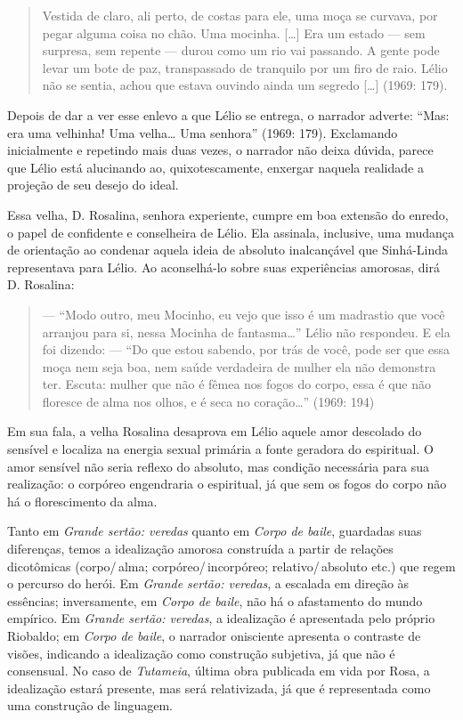 {\begin{quote}
Vestida de claro, ali perto, de costas para ele, uma moça se curvava,
por pegar alguma coisa no chão. Uma mocinha. [\ldots{}] Era um estado ---
sem surpresa, sem repente --- durou como um rio vai passando. A gente
pode levar um bote de paz, transpassado de tranquilo por um firo de
raio. Lélio não se sentia, achou que estava ouvindo ainda um segredo
[\ldots{}] (1969: 179).
\end{quote}

Depois de dar a ver esse enlevo a que Lélio se entrega, o narrador
adverte: “Mas: era uma velhinha! Uma velha\ldots{} Uma senhora” (1969:
179). Exclamando inicialmente e repetindo mais duas vezes, o narrador
não deixa dúvida, parece que Lélio está alucinando ao,
quixotescamente, enxergar naquela realidade a projeção de seu desejo
do ideal. 

Essa velha, D. Rosalina, senhora experiente, cumpre em boa extensão do
enredo, o papel de confidente e conselheira de Lélio. Ela assinala,
inclusive, uma mudança de orientação ao condenar aquela ideia de
absoluto inalcançável que Sinhá-Linda representava para Lélio. Ao
aconselhá-lo sobre suas experiências amorosas, dirá D. Rosalina:

\begin{quote}
--- “Modo outro, meu Mocinho, eu vejo que isso é um madrastio que você
arranjou para si, nessa Mocinha de fantasma\ldots{}” Lélio não respondeu.
E ela foi dizendo: --- “Do que estou sabendo, por trás de você, pode
ser que essa moça nem seja boa, nem saúde verdadeira de mulher ela
não demonstra ter. Escuta: mulher que não é fêmea nos fogos do corpo,
essa é que não floresce de alma nos olhos, e é seca no coração\ldots{}”
(1969: 194)
\end{quote}

Em sua fala, a velha Rosalina desaprova em Lélio aquele amor descolado
do sensível e localiza na energia sexual primária a fonte geradora do
espiritual. O amor sensível não seria reflexo do absoluto, mas
condição necessária para sua realização: o corpóreo engendraria o
espiritual, já que sem os fogos do corpo não há o florescimento da
alma.

Tanto em \emph{Grande sertão: veredas} quanto em \emph{Corpo de
baile}, guardadas suas diferenças, temos a idealização amorosa
construída a partir de relações dicotômicas (corpo/\,alma;
corpóreo/\,incorpóreo; relativo/\,absoluto etc.) que regem o percurso do
herói. Em \emph{Grande sertão: veredas}, a escalada em direção às
essências; inversamente, em \emph{Corpo de baile}, não há o
afastamento do mundo empírico. Em \emph{Grande sertão: veredas}, a
idealização é apresentada pelo próprio Riobaldo; em \emph{Corpo de
baile}, o narrador onisciente apresenta o contraste de visões,
indicando a idealização como construção subjetiva, já que não é
consensual. No caso de \emph{Tutameia}, última obra publicada em
vida por Rosa, a idealização estará presente, mas será relativizada,
já que é representada como uma construção de linguagem.

}
